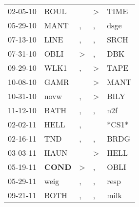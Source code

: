 \begin{supertabular}{p{0.07\textwidth}p{0.06\textwidth}p{0.02\textwidth}p{0.02\textwidth}p{0.06\textwidth}}
          02-05-10\textsuperscript{} &           ROUL\textsuperscript{} &                  &     \textgreater &           TIME\textsuperscript{} \\
          05-29-10\textsuperscript{} &           MANT\textsuperscript{} &                , &                , &           dsge\textsuperscript{} \\
          07-13-10\textsuperscript{} &           LINE\textsuperscript{} &                , &                , &           SRCH\textsuperscript{} \\
          07-31-10\textsuperscript{} &           OBLI\textsuperscript{} &     \textgreater &                , &            DBK\textsuperscript{} \\
          09-29-10\textsuperscript{} &           WLK1\textsuperscript{} &                , &     \textgreater &           TAPE\textsuperscript{} \\
          10-08-10\textsuperscript{} &           GAMR\textsuperscript{} &                  &     \textgreater &           MANT\textsuperscript{} \\
          10-31-10\textsuperscript{} &           novw\textsuperscript{} &                , &     \textgreater &           BILY\textsuperscript{} \\
          11-12-10\textsuperscript{} &           BATH\textsuperscript{} &                , &                , &            n2f\textsuperscript{} \\
          02-02-11\textsuperscript{} &           HELL\textsuperscript{} &                , &                  &                            *CS1* \\
          02-16-11\textsuperscript{} &            TND\textsuperscript{} &                , &                , &           BRDG\textsuperscript{} \\
          03-03-11\textsuperscript{} &           HAUN\textsuperscript{} &                  &     \textgreater &           HELL\textsuperscript{} \\
          05-19-11\textsuperscript{} &  \textbf{COND\textsuperscript{}} &     \textgreater &                , &           OBLI\textsuperscript{} \\
          05-29-11\textsuperscript{} &           weig\textsuperscript{} &                , &                , &           resp\textsuperscript{} \\
          09-21-11\textsuperscript{} &           BOTH\textsuperscript{} &                , &                , &           milk\textsuperscript{} \\

\end{supertabular}
